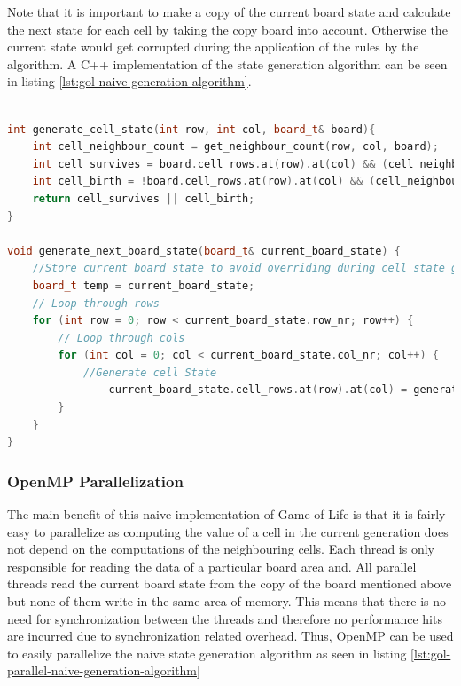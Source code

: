 \documentclass[a4paper,german,12pt,twoside=false]{scrartcl} %
\begin{document}
Note that it is important to make a copy of the current board state and calculate the next state for each cell by taking the copy board into account. Otherwise the current state would get corrupted during the application of the rules by the algorithm. A C++ implementation of the state generation algorithm can be seen in listing \ref{lst:gol-naive-generation-algorithm}.

\begin{lstlisting}[caption={Naive State Generation Algorithm},label={lst:gol-naive-generation-algorithm},language=C++]

int generate_cell_state(int row, int col, board_t& board){
    int cell_neighbour_count = get_neighbour_count(row, col, board);
    int cell_survives = board.cell_rows.at(row).at(col) && (cell_neighbour_count == 2 || cell_neighbour_count == 3);
    int cell_birth = !board.cell_rows.at(row).at(col) && (cell_neighbour_count == 3);
    return cell_survives || cell_birth;
}

void generate_next_board_state(board_t& current_board_state) {
    //Store current board state to avoid overriding during cell state generation
    board_t temp = current_board_state;
    // Loop through rows
    for (int row = 0; row < current_board_state.row_nr; row++) {
        // Loop through cols
        for (int col = 0; col < current_board_state.col_nr; col++) {
        	//Generate cell State
        		current_board_state.cell_rows.at(row).at(col) = generate_cell_state(row, col, temp);
        }
    }
}
\end{lstlisting}

\subsubsection{OpenMP Parallelization}

The main benefit of this naive implementation of Game of Life is that it is fairly easy to parallelize as computing the value of a cell in the current generation does not depend on the computations of the neighbouring cells. Each thread is only responsible for reading the data of a particular board area and. All parallel threads read the current board state from the copy of the board mentioned above but none of them write in the same area of memory. This means that there is no need for synchronization between the threads and therefore no performance hits are incurred due to synchronization related overhead. Thus, OpenMP can be used to easily parallelize the naive state generation algorithm as seen in listing \ref{lst:gol-parallel-naive-generation-algorithm} \breakln
\end{document}
